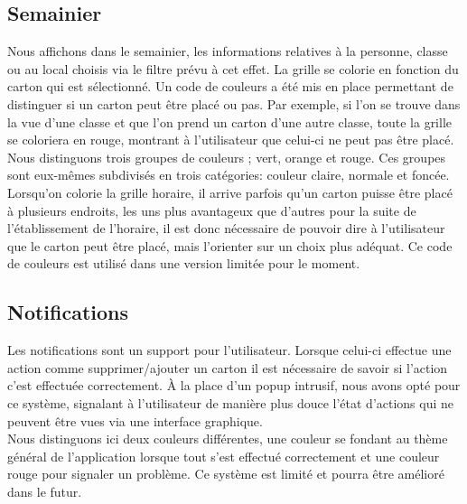 \subsection{Semainier}
Nous affichons dans le semainier, les informations relatives à la personne, classe ou au local choisis via le filtre prévu à cet effet. La grille se colorie en fonction du carton qui est sélectionné. Un code de couleurs a été mis en place permettant de distinguer si un carton peut être placé ou pas. Par exemple, si l'on se trouve dans la vue d'une classe et que l'on prend un carton d'une autre classe, toute la grille se coloriera en rouge, montrant à l'utilisateur que celui-ci ne peut pas être placé.\\
\newline
\indent
Nous distinguons trois groupes de couleurs ; vert, orange et rouge. Ces groupes sont eux-mêmes subdivisés en trois catégories: couleur claire, normale et foncée. Lorsqu'on colorie la grille horaire, il arrive parfois qu'un carton puisse être placé à plusieurs endroits, les uns plus avantageux que d'autres pour la suite de l'établissement de l'horaire, il est donc nécessaire de pouvoir dire à l'utilisateur que le carton peut être placé, mais l'orienter sur un choix plus adéquat. Ce code de couleurs est utilisé dans une version limitée pour le moment.


\subsection{Notifications}
Les notifications sont un support pour l'utilisateur. Lorsque celui-ci effectue une action comme supprimer/ajouter un carton il est nécessaire de savoir si l'action c'est effectuée correctement. À la place d'un popup intrusif, nous avons opté pour ce système, signalant à l'utilisateur de manière plus douce l'état d'actions qui ne peuvent être vues via une interface graphique.\\
\newline
\indent
Nous distinguons ici deux couleurs différentes, une couleur se fondant au thème général de l'application lorsque tout s'est effectué correctement et une couleur rouge pour signaler un problème. Ce système est limité et pourra être amélioré dans le futur.


